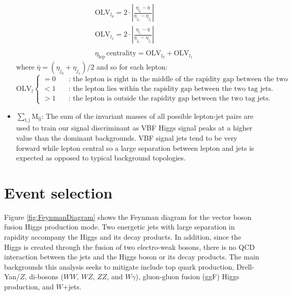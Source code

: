 \begin{itemize}
\begin{eqnarray}
&& \textrm{OLV}_{l_0} = 2 \cdot |\frac{\eta_{l_0}-\bar{\eta}}{\eta_{j_0}-\eta_{j_1}}|  \nonumber\\
&& \textrm{OLV}_{l_1} = 2 \cdot |\frac{\eta_{l_1}-\bar{\eta}}{\eta_{j_0}-\eta_{j_1}}|  \nonumber\\
&&\nonumber \\
&& \eta_{\mathrm{lep}} \, \textrm{centrality} = \textrm{OLV}_{l_0} + \textrm{OLV}_{l_1}
\label{eqn:contOLV_def}
\end{eqnarray}
where $\bar{\eta} = (\eta_{j_0} + \eta_{j_1})/2$ and so for each lepton: 
 \begin{equation}
   \textrm{OLV}_l \left\{
   \begin{array} {ll}
     = 0 & \quad \textrm{:  the lepton is right in the middle of the rapidity gap between the two tag jets.} \\
     < 1 & \quad \textrm{:  the lepton lies within the rapidity gap between the two tag jets.} \\
     >1  & \quad \textrm{:   the lepton is outside the rapidity gap between the two tag jets.} 
    \end{array} \right. 
 \end{equation}
\item $\mathrm{\sum_{l,j} M_{lj}}$: The sum of the invariant masses of all possible lepton-jet pairs are used to train our signal discriminant as VBF Higgs signal peaks at a higher value than the dominant backgrounds. VBF signal jets tend to be very forward while lepton central so a large separation between lepton and jets is expected as opposed to typical background topologies. 
\end{itemize}


\section{Event selection}
Figure \ref{fig:FeynmanDiagram} shows the Feynman diagram for the vector boson fusion Higgs production mode. Two energetic jets with large separation in rapidity accompany the Higgs and its decay products. In addition, since the Higgs is created through the fusion of two electro-weak bosons, there is no QCD interaction between the jets and the Higgs boson or its decay products. The main backgrounds this analysis seeks to mitigate include top quark production, Drell-Yan/$Z$, di-bosons ($WW$, $WZ$, $ZZ$, and $W\gamma$), gluon-gluon fusion (ggF) Higgs production, and $W$+jets. 

